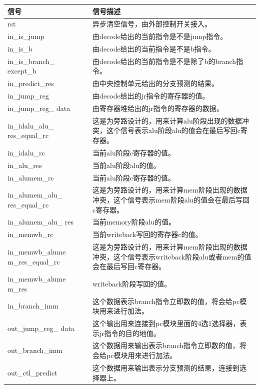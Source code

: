 \begin{center}
    \label{table:predict}
    \begin{longtable}{p{}p{}}
        \toprule
        信号 & 信号描述 \\
        \midrule
            rst & 异步清空信号，由外部控制开关接入。\\
            in\_is\_jump & 由decode给出的当前指令是不是jump指令。\\
            in\_is\_b & 由decode给出的当前指令是不是b指令。\\
            in\_is\_branch\_  except\_b & 由decode给出的当前指令是不是除了b的branch指令。 \\
            in\_predict\_res & 由中央控制单元给出的分支预测的结果。\\
            in\_jump\_reg & 由decode给出的jr指令的寄存器的值。\\
            in\_jump\_reg\_  data & 由寄存器堆给出的jr指令的寄存器的数据。\\
            in\_idalu\_alu\_  res\_equal\_rc & 这是为旁路设计的，用来计算alu阶段出现的数据冲突，这个信号表示alu阶段alu的值会在最后写回c寄存器。\\
            in\_idalu\_rc & 当前alu阶段c寄存器的值。\\
            in\_alu\_res & 当前alu阶段alu的值。\\
            in\_alumem\_rc & 当前alu阶段c寄存器的值。\\
            in\_alumem\_alu\_  res\_equal\_rc & 这是为旁路设计的，用来计算mem阶段出现的数据冲突，这个信号表示mem阶段alu的值会在最后写回c寄存器。\\
            in\_alumem\_alu\_  res & 当前memory阶段alu的值。\\
            in\_memwb\_rc & 当前writeback写回的寄存器c的值。\\
            in\_memwb\_alume  m\_res\_equal\_rc & 这是为旁路设计的，用来计算mem阶段出现的数据冲突，这个信号表示writeback阶段alu或者mem的值会在最后写回c寄存器。\\
            in\_memwb\_alume  m\_res & writeback阶段写回的值。\\
            in\_branch\_imm & 这个数据表示branch指令立即数的值，将会给pc模块用来进行加法。\\
            out\_jump\_reg\_  data & 这个输出用来连接到pc模块里面的4选1选择器，表示jr指令的目的地值。\\
            out\_branch\_imm & 这个数据用来输出表示branch指令立即数的值，将会给pc模块用来进行加法。\\
            out\_ctl\_predict & 这个数据用来输出表示分支预测的结果，连接到选择器上。\\
        \bottomrule
    \end{longtable}
\end{center}


